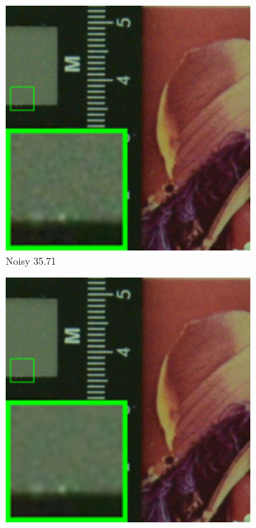 \begin{figure}
    \centering
    \begin{subfigure}[t]{0.19\textwidth}
        \centering
        \includegraphics[width=1\textwidth]{images/mcwnnm/cc/resize_br_Noisy_d800_iso1600_2.png}
		\caption{Noisy 35.71}
    \end{subfigure}
    \hfill
    \begin{subfigure}[t]{0.19\textwidth}
        \centering
        \includegraphics[width=1\textwidth]{images/mcwnnm/cc/resize_br_CBM3D_CC15_d800_iso1600_2.png}

\end{subfigure}
\end{figure}

